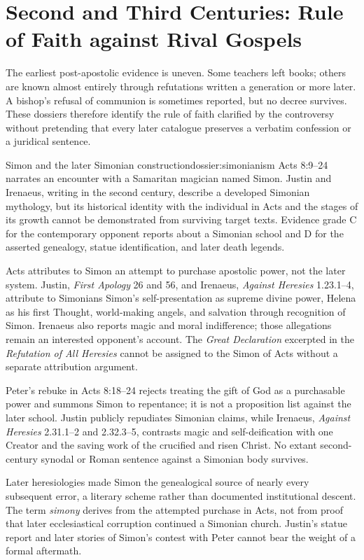 \section{Second and Third Centuries: Rule of Faith against Rival Gospels}

The earliest post-apostolic evidence is uneven. Some teachers left books; others are known almost entirely through refutations written a generation or more later. A bishop's refusal of communion is sometimes reported, but no decree survives. These dossiers therefore identify the rule of faith clarified by the controversy without pretending that every later catalogue preserves a verbatim confession or a juridical sentence.

\begin{heresydossier}{Simon and the later Simonian construction}{dossier:simonianism}
\objectfield Acts 8:9--24 narrates an encounter with a Samaritan magician named Simon. Justin and Irenaeus, writing in the second century, describe a developed Simonian mythology, but its historical identity with the individual in Acts and the stages of its growth cannot be demonstrated from surviving target texts. Evidence grade C for the contemporary opponent reports about a Simonian school and D for the asserted genealogy, statue identification, and later death legends.

\propositionfield Acts attributes to Simon an attempt to purchase apostolic power, not the later system. Justin, \emph{First Apology} 26 and 56, and Irenaeus, \emph{Against Heresies} 1.23.1--4, attribute to Simonians Simon's self-presentation as supreme divine power, Helena as his first Thought, world-making angels, and salvation through recognition of Simon. Irenaeus also reports magic and moral indifference; those allegations remain an interested opponent's account. The \emph{Great Declaration} excerpted in the \emph{Refutation of All Heresies} cannot be assigned to the Simon of Acts without a separate attribution argument.

\responsefield Peter's rebuke in Acts 8:18--24 rejects treating the gift of God as a purchasable power and summons Simon to repentance; it is not a proposition list against the later school. Justin publicly repudiates Simonian claims, while Irenaeus, \emph{Against Heresies} 2.31.1--2 and 2.32.3--5, contrasts magic and self-deification with one Creator and the saving work of the crucified and risen Christ. No extant second-century synodal or Roman sentence against a Simonian body survives.

\aftermathfield Later heresiologies made Simon the genealogical source of nearly every subsequent error, a literary scheme rather than documented institutional descent. The term \emph{simony} derives from the attempted purchase in Acts, not from proof that later ecclesiastical corruption continued a Simonian church. Justin's statue report and later stories of Simon's contest with Peter cannot bear the weight of a formal aftermath.
\end{heresydossier}

